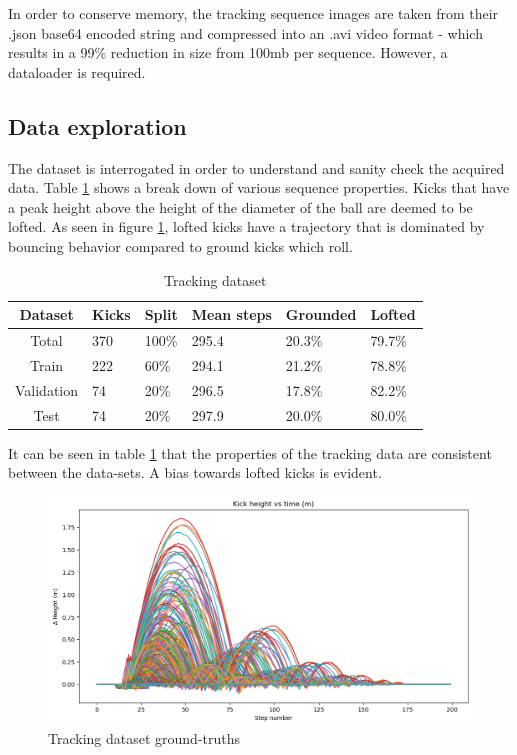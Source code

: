 \documentclass[a4paper,twoside,12pt]{report}
\begin{document}
In order to conserve memory, the tracking sequence images are taken from their .json base64 encoded string and compressed into an .avi video format - which results in a 99\% reduction in size from 100mb per sequence. However, a dataloader is required.

\subsection{Data exploration}

The dataset is interrogated in order to understand and sanity check the acquired data. Table \ref{tab:tracking} shows a break down of various sequence properties. Kicks that have a peak height above the height of the diameter of the ball are deemed to be lofted. As seen in figure \ref{fig:plotkicks}, lofted kicks have a trajectory that is dominated by bouncing behavior compared to ground kicks which roll.

\begin{table}[h!]
\fontsize{9.5pt}{12pt}\selectfont
\centering
\begin{tabular}{c|ll|l|ll}
{\bf Dataset}	&{\bf Kicks}	&{\bf Split}	&{\bf Mean steps}	&{\bf Grounded}	&{\bf Lofted}	\\\hline
Total			&370			&100\%			&295.4			&20.3\%			&79.7\%			\\\hline   
Train			&222			&60\%			&294.1			&21.2\%			&78.8\%			\\\hline  
Validation		&74				&20\%			&296.5			&17.8\%			&82.2\%			\\\hline  
Test			&74				&20\%			&297.9			&20.0\%			&80.0\%			\\\hline                        
\end{tabular}
\caption{Tracking dataset}
\label{tab:tracking}
\end{table}

It can be seen in table \ref{tab:tracking} that the properties of the tracking data are consistent between the data-sets. A bias towards lofted kicks is evident.

\begin{figure}[h!]
\begin{center}
\includegraphics[width=16cm]{images/plotkicks.png}
\caption{Tracking dataset ground-truths}
\label{fig:plotkicks}
\end{center}
\end{figure}
\end{document}
